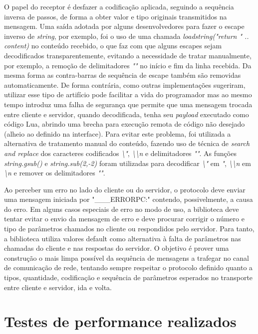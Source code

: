 \documentclass[11pt]{article}
\begin{document}
O papel do receptor é desfazer a codificação aplicada, seguindo a sequência
inversa de passos, de forma a obter valor e tipo originais transmitidos na
mensagem. Uma saída adotada por alguns desenvolvedores para fazer o escape
inverso de \textit{string}, por exemplo, foi o uso de uma chamada
\textit{loadstring("return " .. content)} no conteúdo recebido, o que faz com
que alguns escapes sejam decodificados transparentemente, evitando a necessidade
de tratar manualmente, por exemplo, a remoção de delimitadores \textit{""} no
início e fim da linha recebida. Da mesma forma as contra-barras de sequência de
escape também são removidas automaticamente. De forma contrária, como outras
implementações sugeriram, utilizar esse tipo de artifício pode facilitar a vida
do programador mas ao mesmo tempo introduz uma falha de segurança que permite
que uma mensagem trocada entre cliente e servidor, quando decodificada, tenha
seu \textit{payload} executado como código Lua, abrindo uma brecha para execução
remota de código não desejado (alheio ao definido na interface). Para evitar
este problema, foi utilizada a alternativa de tratamento manual do conteúdo,
fazendo uso de técnica de \textit{search and replace} dos caracteres codificados
\textit{\textbackslash{}"}, \textit{\textbackslash{}\textbackslash{}n} e
delimitadores \textit{""}. As funções \textit{string.gsub()} e
\textit{string.sub(2,-2)} foram utilizadas para decodificar
\textit{\textbackslash{}"} em \textit{"},
\textit{\textbackslash{}\textbackslash{}n} em \textit{\textbackslash{}n} e
remover os delimitadores \textit{""}.

Ao perceber um erro no lado do cliente ou do servidor, o protocolo deve enviar
uma mensagem iniciada por "\_\_\_ERRORPC:" contendo, possivelmente, a causa do
erro. Em alguns casos especiais de erro no modo de uso, a biblioteca deve tentar
evitar o envio da mensagem de erro e deve procurar corrigir o número e tipo de
parâmetros chamados no cliente ou respondidos pelo servidor. Para tanto, a
biblioteca utiliza valores default como alternativa à falta de parâmetros nas
chamadas do cliente e nas respostas do servidor. O objetivo é prover uma
construção o mais limpa possível da sequência de mensagens a trafegar no canal
de comunicação de rede, tentando sempre respeitar o protocolo definido quanto a
tipos, quantidade, codificação e sequência de parâmetros esperados no transporte
entre cliente e servidor, ida e volta.

\section{Testes de performance realizados}\label{sec:perf}
\end{document}

